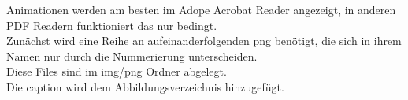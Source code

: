 \documentclass[./\jobname.tex]{subfiles}
\begin{document}
Animationen werden am besten im Adope Acrobat Reader angezeigt, in anderen PDF Readern funktioniert das nur bedingt. \\
Zunächst wird eine Reihe an aufeinanderfolgenden png benötigt, die sich in ihrem Namen nur durch die Nummerierung unterscheiden. \\
Diese Files sind im img/png Ordner abgelegt. \\
Die caption wird dem Abbildungsverzeichnis hinzugefügt. \\

\begin{figure}[H]
	\centering
	\noindent{}
	\label{fig:init_gif_coord}
\end{figure} 
\end{document}
